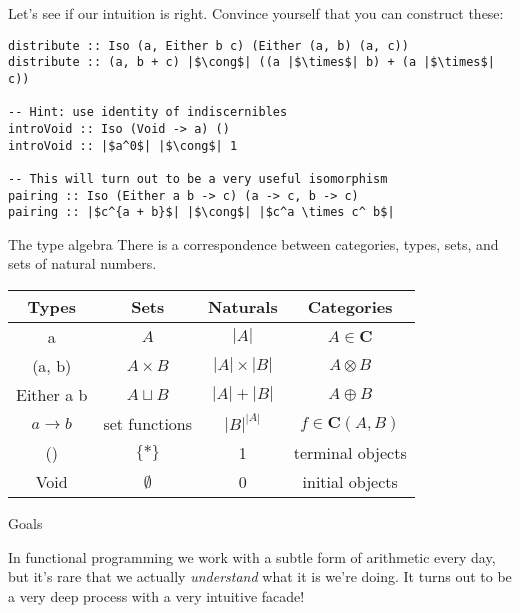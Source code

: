 \documentclass[tikz]{beamer}
\theoremstyle{definition}
\newcommand{\cat}[1]{\mathbf{#1}}
\begin{document}
\begin{frame}[fragile]
Let's see if our intuition is right. Convince yourself that you can construct these:

\begin{verbatim}
distribute :: Iso (a, Either b c) (Either (a, b) (a, c))
distribute :: (a, b + c) |$\cong$| ((a |$\times$| b) + (a |$\times$| c))

-- Hint: use identity of indiscernibles
introVoid :: Iso (Void -> a) ()
introVoid :: |$a^0$| |$\cong$| 1

-- This will turn out to be a very useful isomorphism
pairing :: Iso (Either a b -> c) (a -> c, b -> c)
pairing :: |$c^{a + b}$| |$\cong$| |$c^a \times c^ b$|
\end{verbatim}
\end{frame}

\begin{frame}{The type algebra}
There is a correspondence between categories, types, sets, and sets of natural numbers.

\begin{center}
\begin{tabular}{|c|c|c|c|}
\hline
Types & Sets & Naturals & Categories \\
\hline
a       & $A$ & $|A|$  & $A \in \cat{C}$ \\
(a, b) & $A \times B$ & $|A| \times |B|$ & $A \otimes B$ \\
Either a b & $A \sqcup B$ & $|A| + |B|$ & $A \oplus B$ \\
$a \to b$ &  set functions & $|B|^{|A|}$ & $f \in \cat{C}(A, B)$ \\ 
() & $\{*\}$ & 1 & terminal objects \\
Void & $\emptyset$ & 0 & initial objects \\ \hline 
\end{tabular}
\end{center}
\end{frame}
    

\begin{frame}{Goals}
    
    In functional programming we work with a subtle form of arithmetic every day, but it's rare that we actually \textit{understand} what it is we're doing. It turns out to be a very deep process with a very intuitive facade! 
    
\end{frame}
\end{document}
